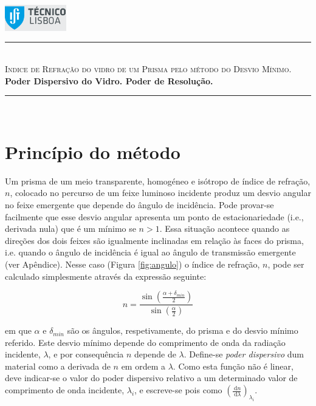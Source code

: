 \documentclass[a4paper,12pt]{article}  %
\author{Prof. Bernardo B. Carvalho}
\date{ Outubro 2012}
\newcommand{\ud}{\,\mathrm{d}}
\newcommand{\HRule}{\rule{\linewidth}{0.5mm}}
\begin{document}
 

	\includegraphics[width=0.2\textwidth]{../logo-ist}%

	\HRule \\[0.5cm]
	{ \huge \sf  \textsc{Indice de Refração do vidro de um Prisma pelo método  do Desvio Mínimo.}} \\[0.4cm] %
	{ \large \bfseries Poder Dispersivo do Vidro. Poder de Resolução.}\\
	\HRule \\%

\section{\sf Princípio do método}
Um prisma de um meio transparente, homogéneo e isótropo de índice de refração, $n$, colocado no percurso de um feixe luminoso incidente produz um desvio angular no feixe emergente que depende do ângulo de incidência. Pode provar-se facilmente que esse desvio angular apresenta um ponto de estacionariedade (i.e., derivada nula) que é um mínimo se $n > 1$. 
Essa situação acontece quando as direções dos dois feixes são igualmente inclinadas em relação às faces do prisma, i.e. quando o ângulo de incidência é igual ao ângulo de transmissão 
emergente (ver Apêndice). 
Nesse caso  (Figura \ref{fig:angulo}) o índice de refração, $n$, pode ser calculado simplesmente através da expressão seguinte: 

\begin{equation}
	\label{eq:desviomim}
	n= \frac{\sin \left( \frac{\alpha+ \delta_{min}}{2} \right) } {\sin \left(  \frac{\alpha}{2} \right)}  
\end{equation}

em que $\alpha$ e  $\delta_{min}$ são os ângulos, respetivamente, do prisma e do desvio mínimo referido. Este desvio mínimo depende do comprimento de onda da radiação incidente, $\lambda$, e por consequência $n$ depende de $\lambda$. Define-se \emph{poder dispersivo} dum material como a derivada de $n$ em ordem a $\lambda$. Como esta função não é linear, deve indicar-se o valor do poder dispersivo relativo a um determinado valor de comprimento de onda incidente,  $\lambda_i$,  e escreve-se pois como $\left( \frac{\ud n}{\ud \lambda } \right)_{\lambda_i}$.
\end{document}
